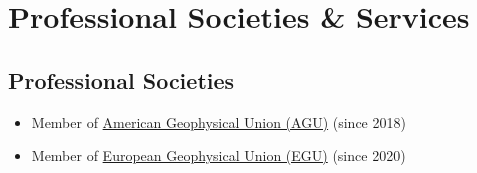 \section{Professional Societies \& Services}

\subsection{Professional Societies}
\begin{itemize}
\item Member of \href{https://sites.agu.org/}{American Geophysical Union (AGU)} (since 2018)
\item Member of \href{https://www.egu.eu/}{European Geophysical Union (EGU)} (since 2020)
\end{itemize}
